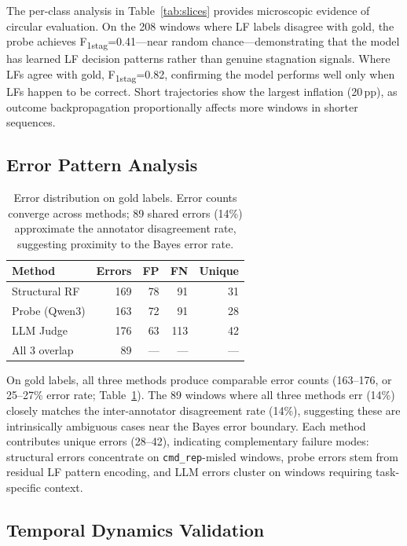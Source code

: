 \documentclass[11pt,a4paper]{article}
\newcommand{\fone}{F\textsubscript{1}}
\newcommand{\pp}{\,pp}
\begin{document}
The per-class analysis in Table~\ref{tab:slices} provides microscopic evidence of circular evaluation.
On the 208 windows where LF labels disagree with gold, the probe achieves \fone{}\textsubscript{stag}=0.41---near random chance---demonstrating that the model has learned LF decision patterns rather than genuine stagnation signals.
Where LFs agree with gold, \fone{}\textsubscript{stag}=0.82, confirming the model performs well only when LFs happen to be correct.
Short trajectories show the largest inflation (20\pp), as outcome backpropagation proportionally affects more windows in shorter sequences.

\subsection{Error Pattern Analysis}
\label{sec:errors}

\begin{table}[t]
\centering
\small
\begin{tabular}{lrrrr}
\toprule
\textbf{Method} & \textbf{Errors} & \textbf{FP} & \textbf{FN} & \textbf{Unique} \\
\midrule
Structural RF & 169 & 78 & 91 & 31 \\
Probe (Qwen3) & 163 & 72 & 91 & 28 \\
LLM Judge & 176 & 63 & 113 & 42 \\
\midrule
All 3 overlap & 89 & --- & --- & --- \\
\bottomrule
\end{tabular}
\caption{Error distribution on gold labels. Error counts converge across methods; 89 shared errors (14\%) approximate the annotator disagreement rate, suggesting proximity to the Bayes error rate.}
\label{tab:errors}
\end{table}

On gold labels, all three methods produce comparable error counts (163--176, or 25--27\% error rate; Table~\ref{tab:errors}).
The 89 windows where all three methods err (14\%) closely matches the inter-annotator disagreement rate (14\%), suggesting these are intrinsically ambiguous cases near the Bayes error boundary.
Each method contributes unique errors (28--42), indicating complementary failure modes: structural errors concentrate on \texttt{cmd\_rep}-misled windows, probe errors stem from residual LF pattern encoding, and LLM errors cluster on windows requiring task-specific context.

\subsection{Temporal Dynamics Validation}
\label{sec:temporal}
\end{document}
